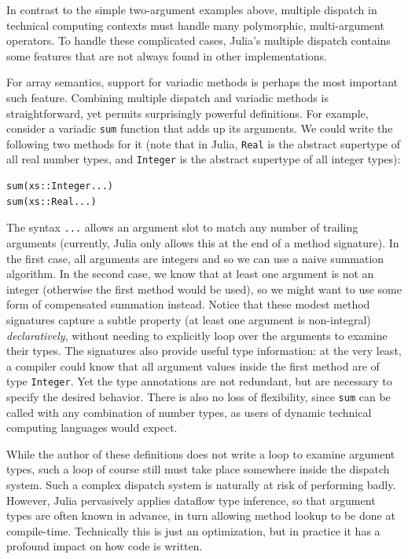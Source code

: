 \documentclass[preprint]{sigplanconf}
\newcommand{\code}[1]{\texttt{#1}}
\begin{document}
In contrast to the simple two-argument examples above, multiple dispatch in
technical computing contexts must handle many polymorphic, multi-argument
operators. To handle these complicated cases, Julia's multiple dispatch
contains some features that are not always found in other implementations.

For array semantics, support for variadic methods is perhaps the most
important such feature. Combining multiple dispatch and variadic methods
is straightforward, yet permits surprisingly powerful definitions. For example,
consider a variadic \code{sum} function that adds up its arguments. We could
write the following two methods for it (note that in Julia, \code{Real} is
the abstract supertype of all real number types, and \code{Integer} is the
abstract supertype of all integer types):

\begin{verbatim}
sum(xs::Integer...)
sum(xs::Real...)
\end{verbatim}

The syntax \code{...} allows an argument slot to match any number of trailing
arguments (currently, Julia only allows this at the end of a method signature).
In the first case, all arguments are integers and so we can use a naive
summation algorithm. In the second case, we know that at least one argument
is not an integer (otherwise the first method would be used), so we might want to use some form of compensated
summation instead. Notice that these modest method signatures
capture a subtle property (at least one argument is non-integral)
\emph{declaratively}, without needing to explicitly loop over the arguments
to examine their types. The signatures also provide useful type information:
at the very least, a compiler could know that all argument values inside
the first method are of type \code{Integer}. Yet the type annotations
are not redundant, but are necessary to specify the desired behavior. There
is also no loss of flexibility, since \code{sum} can be called with any combination
of number types, as users of dynamic technical computing languages would expect.

While the author of these definitions does not write a loop to examine
argument types, such a loop of course still must take place somewhere inside
the dispatch system. Such a complex dispatch system is naturally at risk of
performing badly. However, Julia pervasively applies dataflow type
inference, so that argument types are often known in advance, in turn
allowing method lookup to be done at compile-time. Technically this is
just an optimization, but in practice it has a profound impact on how code
is written.
\end{document}
